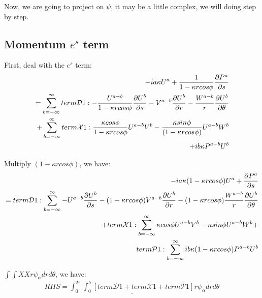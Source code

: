 \documentclass{Note}
\begin{document}
Now, we are going to project on $\psi$, it may be a little complex, we will doing step by step.
 
\subsection{Momentum $e^s$ term}

First, deal with the $e^s$ term:
\begin{equation}
\begin{aligned}
-ia\kappa U^a+{1\over {1-\kappa rcos\phi}}{\partial P^a\over {\partial s}}\\
=\sum_{b=-\infty}^{\infty}
term\mathcal{D}1: -{U^{a-b}\over {1-\kappa r cos\phi}}  {{\partial U^b} \over {\partial s}}-V^{a-b}{{\partial U^b}\over{\partial r}}-{W^{a-b}\over r}{{\partial U^b}\over {\partial \theta}}\\
+ \sum_{b=-\infty}^{\infty}
term\mathcal{X}1: {\kappa cos\phi \over{1-\kappa rcos\phi}}U^{a-b}V^b-{\kappa sin\phi \over{(1-\kappa r cos\phi)}}U^{a-b}W^b\\
+ib\kappa P^{a-b}U^{b}
\end{aligned}
\end{equation}

Multiply $(1-\kappa r cos\phi)$, we have:
\begin{equation}
\begin{aligned}
-ia\kappa(1-\kappa rcos\phi) U^a+{\partial P^a\over {\partial s}}\\
=
term\mathcal{D}1: \sum_{b=-\infty}^{\infty}-{U^{a-b}}  {{\partial U^b} \over {\partial s}}-(1-\kappa rcos\phi)V^{a-b}{{\partial U^b}\over{\partial r}}-(1-\kappa rcos\phi){W^{a-b}\over r}{{\partial U^b}\over {\partial \theta}}\\
+ 
term\mathcal{X}1: \sum_{b=-\infty}^{\infty} {\kappa cos\phi }U^{a-b}V^b-{\kappa sin\phi }U^{a-b}W^b+\\
term\mathcal{P}1: \sum_{b=-\infty}^{\infty} ib\kappa (1-\kappa rcos\phi)P^{a-b}U^{b}
\end{aligned}
\end{equation}

$\int \int  XX  r \psi_\alpha dr d\theta$,  we have:
\begin{equation}
\begin{aligned}
\underline{RHS=\int_0^{2\pi} \int_0^h  [term\mathcal{D}1+term\mathcal{X}1+term\mathcal{P}1]  r \psi_\alpha dr d\theta}
\end{aligned}
\end{equation}
\end{document}
